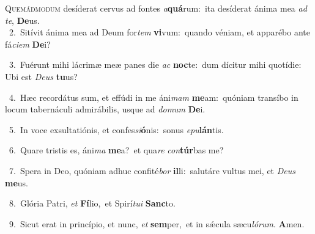 \lettrine{\initial\textcolor{\initialcolor}{Q}}{uemádmodum} desíderat cervus ad fontes \textit{a}\-\textbf{quá}rum:~\star ita desíderat ánima mea \textit{ad} \textit{te}\-, \textbf{De}\-us.\\
{\numbfont\textcolor{\numbcolor}{~2.}}~Sitívit ánima mea ad Deum for\textit{tem} \textbf{vi}\-vum:~\star quando véniam, et apparébo ante fá\-\textit{ci}\-\textit{em} \textbf{De}\-i?\par
{\numbfont\textcolor{\numbcolor}{~3.}}~Fuérunt mihi lácrimæ meæ panes die \textit{ac} \textbf{noc}\-te:~\star dum dícitur mihi quotídie: Ubi est \textit{De}\-\textit{us} \textbf{tu}\-us?\par
{\numbfont\textcolor{\numbcolor}{~4.}}~Hæc recordátus sum, et effúdi in me áni\textit{mam} \textbf{me}\-am:~\star quóniam transíbo in locum tabernáculi admirábilis, usque ad \textit{do}\-\textit{mum} \textbf{De}\-i.\par
{\numbfont\textcolor{\numbcolor}{~5.}}~In voce exsultatiónis, et confes\-\textit{si}\-\textbf{ó}nis:~\star sonus \textit{e}\-\textit{pu}\textbf{lán}tis.\par
{\numbfont\textcolor{\numbcolor}{~6.}}~Quare tristis es, áni\textit{ma} \textbf{me}\-a?~\star et qua\textit{re} \textit{con}\-\textbf{túr}bas me?\par
{\numbfont\textcolor{\numbcolor}{~7.}}~Spera in Deo, quóniam adhuc confité\textit{bor} \textbf{il}\-li:~\star salutáre vultus mei, et \textit{De}\-\textit{us} \textbf{me}\-us.\par
{\numbfont\textcolor{\numbcolor}{~8.}}~Glória Patri, \textit{et} \textbf{Fí}\-lio,~\star et Spirí\-\textit{tu}\-\textit{i} \textbf{Sanc}\-to.\par
{\numbfont\textcolor{\numbcolor}{~9.}}~Sicut erat in princípio, et nunc, \textit{et} \textbf{sem}\-per,~\star et in sǽcula sæcu\-\textit{ló}\-\textit{rum}. \textbf{A}\-men.\par
